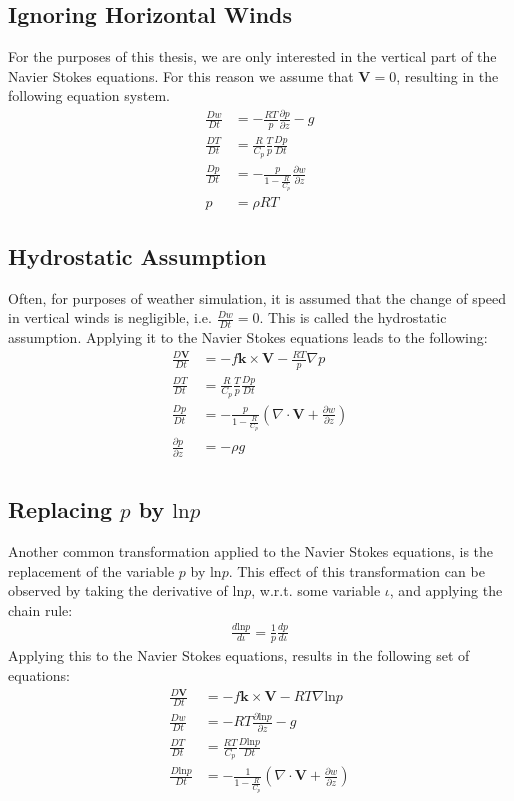 \subsection{Ignoring Horizontal Winds}
For the purposes of this thesis, we are only interested in the vertical part of the Navier Stokes equations.
For this reason we assume that $\textbf{V}=0$, resulting in the following equation system.
\begin{align*}
\frac{Dw}{Dt} &= - \frac{RT}{p} \frac{\partial p}{\partial z} - g \\
\frac{DT}{Dt} &= \frac{R}{C_p}\frac{T}{p}\frac{Dp}{Dt}\\
\frac{Dp}{Dt} &= -\frac{p}{1- \frac{R}{C_p}} \frac{\partial w}{\partial z}\\
p &= \rho R T
\end{align*}

\subsection{Hydrostatic Assumption}
Often, for purposes of weather simulation, it is assumed that the change of speed in vertical winds is negligible, i.e. $\frac{Dw}{Dt}=0$.
This is called the hydrostatic assumption.
Applying it to the Navier Stokes equations leads to the following:
\begin{align*}
\frac{D\textbf{V}}{Dt} &= -f\boldsymbol{k} \times \textbf{V} - \frac{RT}{p}\nabla p\\
\frac{DT}{Dt} &= \frac{R}{C_p}\frac{T}{p}\frac{Dp}{Dt}\\
\frac{Dp}{Dt} &= -\frac{p}{1- \frac{R}{C_p}} (\nabla \cdot \textbf{V} + \frac{\partial w}{\partial z})\\
\frac{\partial p}{\partial z} &= -\rho g \\
\end{align*}

\subsection{Replacing $p$ by $\text{ln}p$}
Another common transformation applied to the Navier Stokes equations, is the replacement of the variable $p$ by $\text{ln}p$.
This effect of this transformation can be observed by taking the derivative of $\text{ln}p$, w.r.t. some variable $\iota$, and applying the chain rule:
\begin{align*}
\frac{d\text{ln}p}{d\iota} =  \frac{1}{p}\frac{dp}{d\iota}
\end{align*}
Applying this to the Navier Stokes equations, results in the following set of equations:
\begin{align*}
\frac{D\textbf{V}}{Dt} &= -f\boldsymbol{k} \times \textbf{V} - RT\nabla \text{ln}p\\
\frac{Dw}{Dt} &= - RT \frac{\partial \text{ln}p}{\partial z} - g \\
\frac{DT}{Dt} &= \frac{RT}{C_p}\frac{D\text{ln}p}{Dt}\\
\frac{D\text{ln}p}{Dt} &= -\frac{1}{1- \frac{R}{C_p}} (\nabla \cdot \textbf{V} + \frac{\partial w}{\partial z})
\end{align*}

